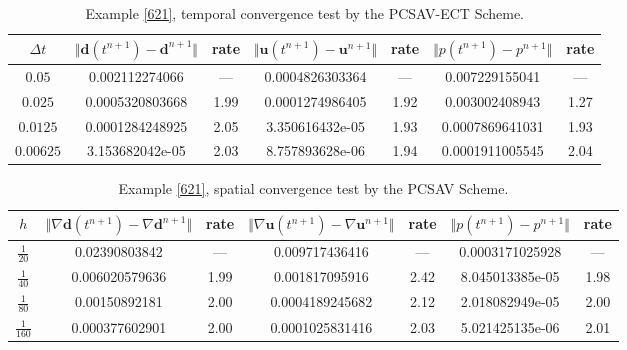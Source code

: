 \documentclass[12pt,reqno]{amsart}
\numberwithin{equation}{section}
\newcommand{\uu}{\mathrm{\textbf{u}}}
\newcommand{\dd}{\mathrm{\textbf{d}}}
\begin{document}
\begin{table}[htbp]
\centering
\caption{\noindent
Example \ref{621}, temporal convergence test by the PCSAV-ECT Scheme.}
\label{tab:PCSAV-ect-temporal-convergence}
\begin{tabular}{|c||c|c||c|c||c|c|}
\hline
$\Delta t$ 
& $\Vert \dd(t^{n+1})-\dd^{n+1}\Vert$ & rate 
& $\Vert \uu(t^{n+1})-\uu^{n+1}\Vert$ & rate 
& $\Vert p(t^{n+1})-p^{n+1}\Vert$ & rate \\ 
\hline
$0.05$ & 0.002112274066 & --- & 0.0004826303364 & --- & 0.007229155041 & --- \\ 
$0.025$ & 0.0005320803668 & 1.99 & 0.0001274986405 & 1.92 & 0.003002408943 & 1.27 \\ 
$0.0125$ & 0.0001284248925 & 2.05 & 3.350616432e-05 & 1.93 & 0.0007869641031 & 1.93 \\ 
$0.00625$ & 3.153682042e-05 & 2.03 & 8.757893628e-06 & 1.94 & 0.0001911005545 & 2.04 \\ 
\hline
\end{tabular}
\end{table}


\begin{table}[htbp]
\centering
\caption{\noindent
Example \ref{621}, spatial convergence test by the PCSAV Scheme.}
\label{tab:PCSAV-spatial-convergence}
\begin{tabular}{|c||c|c||c|c||c|c|}
\hline
$h$ 
& $\Vert \nabla\dd(t^{n+1})-\nabla\dd^{n+1}\Vert$ & rate 
& $\Vert \nabla\uu(t^{n+1})-\nabla\uu^{n+1}\Vert$ & rate 
& $\Vert p(t^{n+1})-p^{n+1}\Vert$ & rate \\ 
\hline
$\frac{1}{20}$ & 0.02390803842 & --- & 0.009717436416 & --- & 0.0003171025928 & --- \\ 
$\frac{1}{40}$ & 0.006020579636 & 1.99 & 0.001817095916 & 2.42 & 8.045013385e-05 & 1.98 \\ 
$\frac{1}{80}$ & 0.00150892181 & 2.00 & 0.0004189245682 & 2.12 & 2.018082949e-05 & 2.00 \\ 
$\frac{1}{160}$ & 0.000377602901 & 2.00 & 0.0001025831416 & 2.03 & 5.021425135e-06 & 2.01 \\ 
\hline
\end{tabular}
\end{table}
\end{document}
